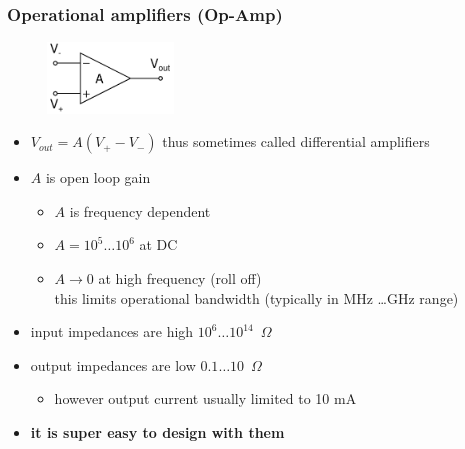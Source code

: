\documentclass[beamer]{standalone}
\begin{document}
\begin{frame}
\frametitle{Operational amplifiers (Op-Amp)}
\begin{figure}
	\includegraphics[width=0.30\textwidth]{./schematics/opamp.pdf}
\end{figure}
\begin{itemize}
	\item $V_{out}=A (V_+ - V_-)$ thus sometimes called differential
		amplifiers
	\item $A$ is open loop gain
		\begin{itemize}
			\item $A$ is frequency dependent
			\item $A=10^5 \dots 10^6$ at DC
			\item $A \to 0$ at high frequency (roll off)\\
				this limits operational bandwidth (typically in MHz \dots GHz range)
		\end{itemize}
	\item input impedances are high $10^6 \dots 10^{14}$~$\Omega$
	\item output impedances are low $0.1 \dots 10$~$\Omega$
		\begin{itemize}
			\item \alert{however output current usually limited to 10 mA}
		\end{itemize}
	\item {\bf it is super easy to design with them}
\end{itemize}
\end{frame}
\end{document}
